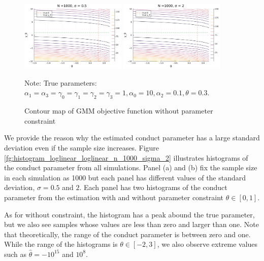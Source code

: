 \documentclass[11pt, a4paper]{article}
\begin{document}
\begin{figure}[!htbp]
  \begin{center}
  \includegraphics[width = 0.45\textwidth]
  {figuretable/contour_loglinear_loglinear_n_1000_sigma_0.5.pdf}
  \includegraphics[width = 0.45\textwidth]
  {figuretable/contour_loglinear_loglinear_n_1000_sigma_2.pdf}
  \caption{Contour map of GMM objective function without parameter constraint}
  \label{fg:contour_loglinear_loglinear_n_1000_sigma_2} 
  \end{center}
  \footnotesize
  Note: True parameters: $\alpha_1 = \alpha_3 = \gamma_0 = \gamma_1 = \gamma_2  = \gamma_3 = 1, \alpha_0 = 10, \alpha_2 = 0.1,  \theta = 0.3.$
\end{figure} 



We provide the reason why the estimated conduct parameter has a large standard deviation even if the sample size increases. 
Figure \ref{fg:histogram_loglinear_loglinear_n_1000_sigma_2} illustrates histograms of the conduct parameter from all simulations.
Panel (a) and (b) fix the sample size in each simulation as 1000 but each panel has different values of the standard deviation, $\sigma = 0.5$ and $2$.
Each panel has two histograms of the conduct parameter from the estimation with and without parameter constraint $\theta \in [0,1]$.

As for without constraint, the histogram has a peak abound the true parameter, but we also see samples whose values are less than zero and larger than one.
Note that theoretically, the range of the conduct parameter is between zero and one. 
While the range of the histograms is $\theta \in [-2, 3]$,  we also observe extreme values such as $\hat{\theta} = -10^{15}$ and $10^{8}$.
\end{document}
